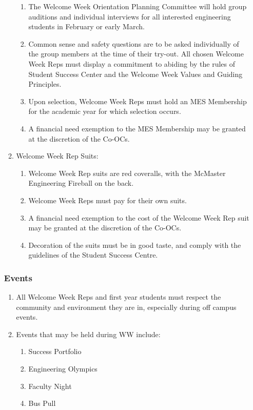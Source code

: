 \begin{enumerate}
\begin{enumerate}
  \begin{enumerate}
   \item
    The Welcome Week Orientation Planning Committee will hold group
    auditions and individual interviews for all interested engineering
    students in February or early March.
   \item
    Common sense and safety questions are to be asked individually of
    the group members at the time of their try-out. All chosen Welcome
    Week Reps must display a commitment to abiding by the rules of
    Student Success Center and the Welcome Week Values and Guiding
    Principles.
   \item
    Upon selection, Welcome Week Reps must hold an MES Membership for
    the academic year for which selection occurs.
   \item
    A financial need exemption to the MES Membership may be granted at
    the discretion of the Co-OCs.
  \end{enumerate}
 \item
  Welcome Week Rep Suits:

  \begin{enumerate}
   \item
    Welcome Week Rep suits are red coveralls, with the McMaster
    Engineering Fireball on the back.
   \item
    Welcome Week Reps must pay for their own suits.
   \item
    A financial need exemption to the cost of the Welcome Week Rep suit
    may be granted at the discretion of the Co-OCs.
   \item
    Decoration of the suits must be in good taste, and comply with the
    guidelines of the Student Success Centre.

  \end{enumerate}
\end{enumerate}

\hypertarget{events}{%
 \subsubsection{Events}
 \label{events}}
\begin{enumerate}
 \item
  All Welcome Week Reps and first year students must respect the
  community and environment they are in, especially during off campus
  events.
 \item
  Events that may be held during WW include:

  \begin{enumerate}
   \item
    Success Portfolio
   \item
    Engineering Olympics
   \item
    Faculty Night
   \item
    Bus Pull


\end{enumerate}
\end{enumerate}
\end{enumerate}
